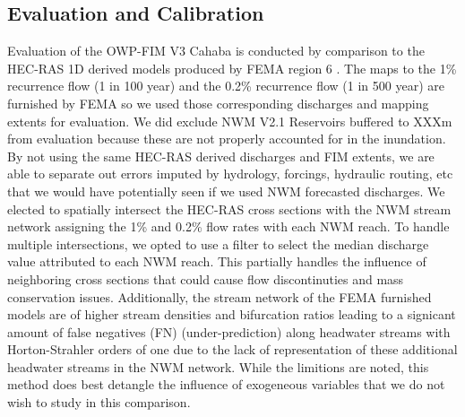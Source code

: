\subsection{Evaluation and Calibration}
\label{ssec:evaluation_and_calibration}
%
Evaluation of the OWP-FIM V3 Cahaba is conducted by comparison to the HEC-RAS 1D derived models produced by FEMA region 6 \cite{fema2021base,fema2021estimated}.
The maps to the 1\% recurrence flow (1 in 100 year) and the 0.2\% recurrence flow (1 in 500 year) are furnished by FEMA so we used those corresponding discharges and mapping extents for evaluation.
We did exclude NWM V2.1 Reservoirs buffered to XXXm from evaluation because these are not properly accounted for in the inundation.
By not using the same HEC-RAS derived discharges and FIM extents, we are able to separate out errors imputed by hydrology, forcings, hydraulic routing, etc that we would have potentially seen if we used NWM forecasted discharges.
We elected to spatially intersect the HEC-RAS cross sections with the NWM stream network assigning the 1\% and 0.2\% flow rates with each NWM reach. 
To handle multiple intersections, we opted to use a filter to select the median discharge value attributed to each NWM reach.
This partially handles the influence of neighboring cross sections that could cause flow discontinuties and mass conservation issues.
Additionally, the stream network of the FEMA furnished models are of higher stream densities and bifurcation ratios leading to a signicant amount of false negatives (FN) (under-prediction) along headwater streams with Horton-Strahler orders of one due to the lack of representation of these additional headwater streams in the NWM network.
While the limitions are noted, this method does best detangle the influence of exogeneous variables that we do not wish to study in this comparison.

